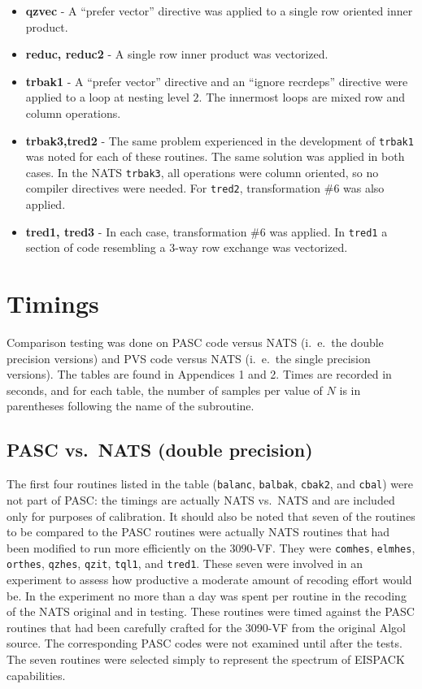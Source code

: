 \begin{itemize}
\item {\bf qzvec } -
	A ``prefer vector'' directive was applied
	to a single row oriented inner product.

\item {\bf reduc, reduc2 } - A single row inner product was vectorized.

\item {\bf trbak1} - A ``prefer vector'' directive
	and an ``ignore recrdeps'' directive were applied to a loop
     at nesting level $2$. The innermost loops are mixed row and
     column operations.

\item {\bf trbak3,tred2} - The same problem experienced in the development of
     {\tt trbak1} was
     noted for each of these routines.  The same solution was applied in both
     cases.  In the NATS {\tt trbak3}, all operations were column oriented,
     so no compiler directives were needed.  For {\tt tred2}, transformation
     \#6 was also applied.

\item {\bf tred1, tred3} - In each case, transformation
	\#6 was applied.  In {\tt tred1}
     a section of code resembling a $3$-way row exchange was vectorized.
\end{itemize}

\section{Timings}
Comparison testing was done on PASC code versus NATS (i.\ e.\ the double 
precision versions) and PVS code versus NATS (i.\ e.\ the single
precision versions).
The tables are found in Appendices 1 and 2.
Times are recorded in seconds, and for each table, the number of samples
per value of $N$ is in parentheses following the name of the subroutine.

\subsection{PASC vs.\ NATS (double precision)}
The first four routines listed in the table
({\tt balanc}, {\tt balbak}, {\tt cbak2}, and {\tt cbal}) were
not part of PASC: the timings are actually NATS vs.\ NATS and are  
included only for purposes of calibration.
It should also be noted that seven of the routines to be compared
to the PASC routines were
actually NATS routines that had been modified to run more efficiently
on the 3090-VF.  They were {\tt comhes}, {\tt elmhes}, {\tt orthes},
{\tt qzhes}, {\tt qzit}, {\tt tql1}, and {\tt tred1}.
These seven were involved in an experiment to assess how productive
a moderate amount of recoding effort would be. In the experiment
no more than a day was spent per routine in the recoding of the NATS original
and in testing. These routines were timed against the PASC routines
that had been carefully crafted for the 3090-VF from the original
Algol source. The corresponding PASC codes were not examined until
after the tests.
The seven routines were selected simply to represent the spectrum of
EISPACK capabilities.

